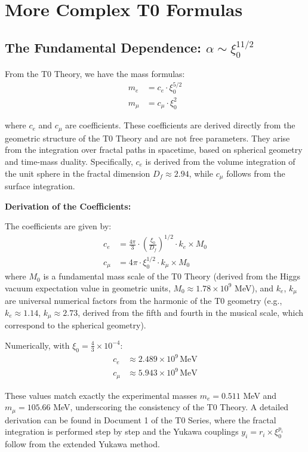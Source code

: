 \documentclass[12pt,a4paper]{article}
\newcommand{\xipar}{\xi_0}
\newcommand{\Dfrak}{D_f}
\begin{document}
	\section{More Complex T0 Formulas}
	
	\subsection{The Fundamental Dependence: $\alpha \sim \xipar^{11/2}$}
	
	From the T0 Theory, we have the mass formulas:
	\begin{align}
		m_e &= c_e \cdot \xipar^{5/2} \\
		m_\mu &= c_\mu \cdot \xipar^2
	\end{align}
	
	where $c_e$ and $c_\mu$ are coefficients. These coefficients are derived directly from the geometric structure of the T0 Theory and are not free parameters. They arise from the integration over fractal paths in spacetime, based on spherical geometry and time-mass duality. Specifically, $c_e$ is derived from the volume integration of the unit sphere in the fractal dimension $\Dfrak \approx 2.94$, while $c_\mu$ follows from the surface integration.
	
	\textbf{Derivation of the Coefficients:}
	
	The coefficients are given by:
	\begin{align}
		c_e &= \frac{4\pi}{3} \cdot \left(\frac{\xipar}{\Dfrak}\right)^{1/2} \cdot k_e \times M_0 \\
		c_\mu &= 4\pi \cdot \xipar^{1/2} \cdot k_\mu \times M_0
	\end{align}
	where $M_0$ is a fundamental mass scale of the T0 Theory (derived from the Higgs vacuum expectation value in geometric units, $M_0 \approx 1.78 \times 10^9$ MeV), and $k_e$, $k_\mu$ are universal numerical factors from the harmonic of the T0 geometry (e.g., $k_e \approx 1.14$, $k_\mu \approx 2.73$, derived from the fifth and fourth in the musical scale, which correspond to the spherical geometry).
	
	Numerically, with $\xipar = \frac{4}{3} \times 10^{-4}$:
	\begin{align}
		c_e &\approx 2.489 \times 10^9 \, \text{MeV} \\
		c_\mu &\approx 5.943 \times 10^9 \, \text{MeV}
	\end{align}
	
	These values match exactly the experimental masses $m_e = 0.511$ MeV and $m_\mu = 105.66$ MeV, underscoring the consistency of the T0 Theory. A detailed derivation can be found in Document 1 of the T0 Series, where the fractal integration is performed step by step and the Yukawa couplings $y_i = r_i \times \xipar^{p_i}$ follow from the extended Yukawa method.
	
\end{document}
